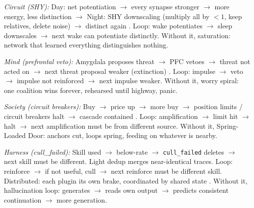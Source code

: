 \documentclass[11pt]{article}
\begin{document}
\textit{Circuit (SHY):} Day: net potentiation $\to$\allowbreak{} every synapse stronger $\to$\allowbreak{} more energy, less distinction $\to$\allowbreak{} Night: SHY downscaling (multiply all by $<1$, keep relatives, delete noise) $\to$\allowbreak{} distinct again \citep{tononi2014}. Loop: wake potentiates $\to$\allowbreak{} sleep downscales $\to$\allowbreak{} next wake can potentiate distinctly. Without it, saturation: network that learned everything distinguishes nothing.

\textit{Mind (prefrontal veto):} Amygdala proposes threat $\to$\allowbreak{} PFC vetoes $\to$\allowbreak{} threat not acted on $\to$\allowbreak{} next threat proposal weaker (extinction) \citep{seth2021}. Loop: impulse $\to$\allowbreak{} veto $\to$\allowbreak{} impulse not reinforced $\to$\allowbreak{} next impulse weaker. Without it, worry spiral: one coalition wins forever, rehearsed until highway, panic.

\textit{Society (circuit breakers):} Buy $\to$\allowbreak{} price up $\to$\allowbreak{} more buy $\to$\allowbreak{} position limits / circuit breakers halt $\to$\allowbreak{} cascade contained \citep{soros1987}. Loop: amplification $\to$\allowbreak{} limit hit $\to$\allowbreak{} halt $\to$\allowbreak{} next amplification must be from different source. Without it, Spring-Loaded Door: anchors cut, loops spring, feeding on whatever is nearby.

\textit{Harness (cull\_failed):} Skill used $\to$\allowbreak{} below-rate $\to$\allowbreak{} \texttt{cull\_failed} deletes $\to$\allowbreak{} next skill must be different. Light dedup merges near-identical traces. Loop: reinforce $\to$\allowbreak{} if not useful, cull $\to$\allowbreak{} next reinforce must be different skill. Distributed: each plugin its own brake, coordinated by shared state \citep{lin2026ahe}. Without it, hallucination loop: generates $\to$\allowbreak{} reads own output $\to$\allowbreak{} predicts consistent continuation $\to$\allowbreak{} more generation.
\end{document}
